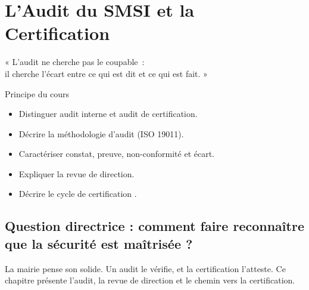 
\chapter{L'Audit du SMSI et la Certification}
\label{chap:audit}

\epigraph{%
    « L'audit ne cherche pas le coupable~:\\
    il cherche l'écart entre ce qui est dit et ce qui est fait. »%
}{Principe du cours}


\begin{boxobjectifs}
\begin{itemize}
    \item Distinguer audit interne et audit de certification.
    \item Décrire la méthodologie d'audit (ISO 19011).
    \item Caractériser constat, preuve, non-conformité et écart.
    \item Expliquer la revue de direction.
    \item Décrire le cycle de certification .
\end{itemize}
\end{boxobjectifs}

\bigskip

\section*{Question directrice : comment faire reconnaître que la sécurité est maîtrisée ?}

La mairie pense son  solide. Un audit le vérifie, et la
certification l'atteste. Ce chapitre présente l'audit, la revue de direction
et le chemin vers la certification.

